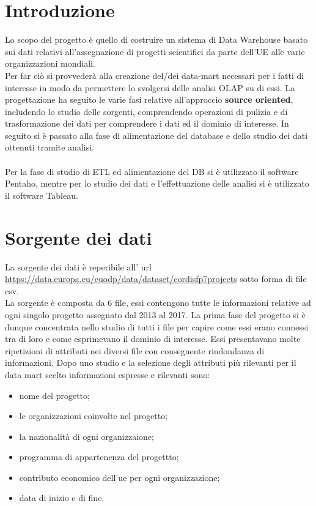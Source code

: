 \documentclass[12pt,a4paper]{report}
\begin{document}
	\begin{titlepage}
		
	\end{titlepage}
	\section*{Introduzione}
	Lo scopo del progetto è quello di costruire un sistema di Data Warehouse basato sui dati relativi all'assegnazione di progetti scientifici da parte dell'UE alle varie organizzazioni mondiali.\\\noindent
	Per far ciò si provvederà alla creazione del/dei data-mart necessari per i fatti di interesse in modo da permettere lo svolgersi delle analisi OLAP su di essi.
	La progettazione ha seguito le varie fasi relative all'approccio \textbf{source oriented}, includendo lo studio delle sorgenti, comprendendo operazioni di pulizia e di trasformazione dei dati per comprendere i dati ed il dominio di interesse. In seguito si è passato alla fase di alimentazione del database e dello studio dei dati ottenuti tramite analisi.\\\\\noindent
	Per la fase di studio di ETL ed alimentazione del DB si è utilizzato il software Pentaho, mentre per lo studio dei dati e l'effettuazione delle analisi si è utilizzato il software Tableau.
	\section*{Sorgente dei dati}
	La sorgente dei dati è reperibile all' url\\ \url{https://data.europa.eu/euodp/data/dataset/cordisfp7projects} sotto forma di file csv.\\\noindent
	La sorgente è composta da 6 file, essi contengono tutte le informazioni relative ad ogni singolo progetto assegnato dal 2013 al 2017. La prima fase del progetto si è dunque concentrata nello studio di tutti i file per capire come essi erano connessi tra di loro e come esprimevano il dominio di interesse. Essi presentavano molte ripetizioni di attributi nei diversi file con conseguente rindondanza di informazioni. Dopo uno studio e la selezione degli attributi più rilevanti per il data mart scelto informazioni espresse e rilevanti sono:
	\begin{itemize}
		\item nome del progetto;
		\item le organizzazioni coinvolte nel progetto;
		\item la nazionalità di ogni organizzaione;
		\item programma di appartenenza del progettto;
		\item contributo economico dell'ue per ogni organizzazione;
		\item data di inizio e di fine.
	\end{itemize}
\end{document}
